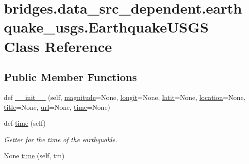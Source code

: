 \hypertarget{classbridges_1_1data__src__dependent_1_1earthquake__usgs_1_1_earthquake_u_s_g_s}{}\section{bridges.\+data\+\_\+src\+\_\+dependent.\+earthquake\+\_\+usgs.\+Earthquake\+U\+S\+GS Class Reference}
\label{classbridges_1_1data__src__dependent_1_1earthquake__usgs_1_1_earthquake_u_s_g_s}
\subsection*{Public Member Functions}
\begin{DoxyCompactItemize}
\item 
def \mbox{\hyperlink{classbridges_1_1data__src__dependent_1_1earthquake__usgs_1_1_earthquake_u_s_g_s_abddcbcfdc6985d7b95f3ce780b53b344}{\+\_\+\+\_\+init\+\_\+\+\_\+}} (self, \mbox{\hyperlink{classbridges_1_1data__src__dependent_1_1earthquake__usgs_1_1_earthquake_u_s_g_s_a3206dcb45c71bf5b704620411c24816d}{magnitude}}=None, \mbox{\hyperlink{classbridges_1_1data__src__dependent_1_1earthquake__usgs_1_1_earthquake_u_s_g_s_ad801b1d84c835053850938da58785cb9}{longit}}=None, \mbox{\hyperlink{classbridges_1_1data__src__dependent_1_1earthquake__usgs_1_1_earthquake_u_s_g_s_a817efb286a9963009b9424d790cc52c0}{latit}}=None, \mbox{\hyperlink{classbridges_1_1data__src__dependent_1_1earthquake__usgs_1_1_earthquake_u_s_g_s_ad4ce59de726463950bf2101eaf72f0af}{location}}=None, \mbox{\hyperlink{classbridges_1_1data__src__dependent_1_1earthquake__usgs_1_1_earthquake_u_s_g_s_acde728a34e0aea4271fe0a9c45919f80}{title}}=None, \mbox{\hyperlink{classbridges_1_1data__src__dependent_1_1earthquake__usgs_1_1_earthquake_u_s_g_s_ae0b89e47a63edbfe3170100304b81a9c}{url}}=None, \mbox{\hyperlink{classbridges_1_1data__src__dependent_1_1earthquake__usgs_1_1_earthquake_u_s_g_s_aacc317fa18e83353df6c8ffb3d47d6c1}{time}}=None)
\item 
def \mbox{\hyperlink{classbridges_1_1data__src__dependent_1_1earthquake__usgs_1_1_earthquake_u_s_g_s_af978827a241b6906c639194e48ed10df}{time}} (self)
\begin{DoxyCompactList}\small\item\em Getter for the time of the earthquakle. \end{DoxyCompactList}\item 
None \mbox{\hyperlink{classbridges_1_1data__src__dependent_1_1earthquake__usgs_1_1_earthquake_u_s_g_s_a0eb81c00089af84128245e3eb41108fe}{time}} (self, tm)

\end{DoxyCompactItemize}
